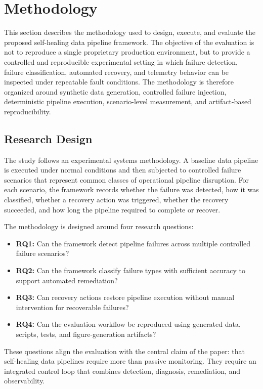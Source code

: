 \section{Methodology}
\label{sec:methodology}

This section describes the methodology used to design, execute, and evaluate the proposed self-healing data pipeline framework. The objective of the evaluation is not to reproduce a single proprietary production environment, but to provide a controlled and reproducible experimental setting in which failure detection, failure classification, automated recovery, and telemetry behavior can be inspected under repeatable fault conditions. The methodology is therefore organized around synthetic data generation, controlled failure injection, deterministic pipeline execution, scenario-level measurement, and artifact-based reproducibility.

\subsection{Research Design}

The study follows an experimental systems methodology. A baseline data pipeline is executed under normal conditions and then subjected to controlled failure scenarios that represent common classes of operational pipeline disruption. For each scenario, the framework records whether the failure was detected, how it was classified, whether a recovery action was triggered, whether the recovery succeeded, and how long the pipeline required to complete or recover.

The methodology is designed around four research questions:

\begin{itemize}
    \item \textbf{RQ1:} Can the framework detect pipeline failures across multiple controlled failure scenarios?
    \item \textbf{RQ2:} Can the framework classify failure types with sufficient accuracy to support automated remediation?
    \item \textbf{RQ3:} Can recovery actions restore pipeline execution without manual intervention for recoverable failures?
    \item \textbf{RQ4:} Can the evaluation workflow be reproduced using generated data, scripts, tests, and figure-generation artifacts?
\end{itemize}

These questions align the evaluation with the central claim of the paper: that self-healing data pipelines require more than passive monitoring. They require an integrated control loop that combines detection, diagnosis, remediation, and observability.

